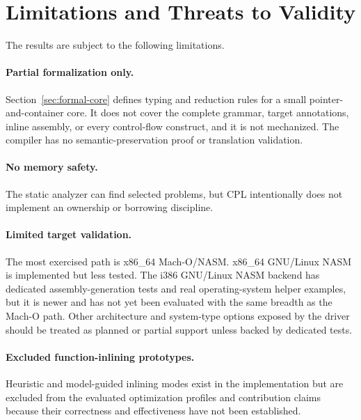 \documentclass[10pt,twocolumn]{article}
\begin{document}
\section{Limitations and Threats to Validity}

\par The results are subject to the following limitations.

\paragraph{Partial formalization only.}
\par Section~\ref{sec:formal-core} defines typing and reduction rules for a small pointer-and-container core. It does not cover the complete grammar, target annotations, inline assembly, or every control-flow construct, and it is not mechanized. The compiler has no semantic-preservation proof or translation validation.

\paragraph{No memory safety.}
\par The static analyzer can find selected problems, but CPL intentionally does not implement an ownership or borrowing discipline.

\paragraph{Limited target validation.}
\par The most exercised path is x86\_64 Mach-O/NASM. x86\_64 GNU/Linux NASM is implemented but less tested. The i386 GNU/Linux NASM backend has dedicated assembly-generation tests and real operating-system helper examples, but it is newer and has not yet been evaluated with the same breadth as the Mach-O path. Other architecture and system-type options exposed by the driver should be treated as planned or partial support unless backed by dedicated tests.

\paragraph{Excluded function-inlining prototypes.}
\par Heuristic and model-guided inlining modes exist in the implementation but are excluded from the evaluated optimization profiles and contribution claims because their correctness and effectiveness have not been established.
\end{document}
